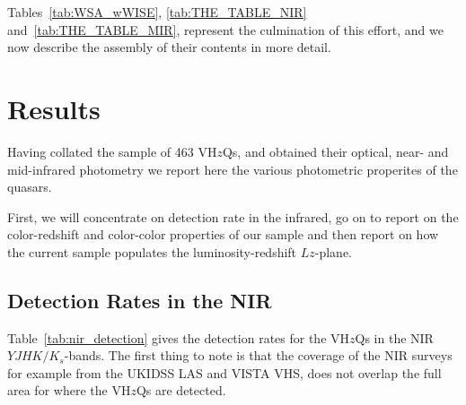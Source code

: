 \documentclass[usenatbib]{mnras}
\begin{document}
Tables~\ref{tab:WSA_wWISE}, \ref{tab:THE_TABLE_NIR} and~\ref{tab:THE_TABLE_MIR}, represent the culmination of this effort, and we now describe the assembly of their contents in more detail.  







\section{Results}
Having collated the sample of 463 VH$z$Qs, and obtained their optical,
near- and mid-infrared photometry we report here the various
photometric properites of the quasars.

First, we will concentrate on detection rate in the infrared, go on to
report on the color-redshift and color-color properties of our sample
and then report on how the current sample populates the
luminosity-redshift $Lz$-plane.


    \subsection{Detection Rates in the NIR}
    Table~\ref{tab:nir_detection} gives the detection rates for the 
    VH$z$Qs in the NIR $YJHK/K_{s}$-bands. 
    The first thing to note is that the coverage of the NIR surveys 
    for example from the UKIDSS LAS and VISTA VHS, does
    not overlap the full area for where the VH$z$Qs are detected. 
\end{document}
